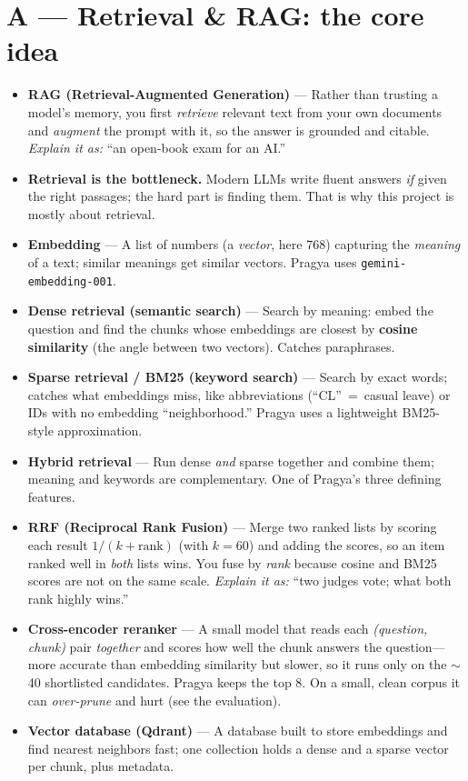 \documentclass[11pt,a4paper,oneside]{report}
\newcommand{\code}[1]{\texttt{#1}}
\begin{document}
\section{A --- Retrieval \& RAG: the core idea}
\begin{itemize}
  \item \textbf{RAG (Retrieval-Augmented Generation)} --- Rather than trusting a model's memory, you
  first \emph{retrieve} relevant text from your own documents and \emph{augment} the prompt with it, so
  the answer is grounded and citable. \emph{Explain it as:} ``an open-book exam for an AI.''
  \item \textbf{Retrieval is the bottleneck.} Modern LLMs write fluent answers \emph{if} given the right
  passages; the hard part is finding them. That is why this project is mostly about retrieval.
  \item \textbf{Embedding} --- A list of numbers (a \emph{vector}, here 768) capturing the \emph{meaning}
  of a text; similar meanings get similar vectors. Pragya uses \code{gemini-embedding-001}.
  \item \textbf{Dense retrieval (semantic search)} --- Search by meaning: embed the question and find the
  chunks whose embeddings are closest by \textbf{cosine similarity} (the angle between two vectors).
  Catches paraphrases.
  \item \textbf{Sparse retrieval / BM25 (keyword search)} --- Search by exact words; catches what
  embeddings miss, like abbreviations (``CL''~=~casual leave) or IDs with no embedding ``neighborhood.''
  Pragya uses a lightweight BM25-style approximation.
  \item \textbf{Hybrid retrieval} --- Run dense \emph{and} sparse together and combine them; meaning and
  keywords are complementary. One of Pragya's three defining features.
  \item \textbf{RRF (Reciprocal Rank Fusion)} --- Merge two ranked lists by scoring each result
  $1/(k+\text{rank})$ (with $k{=}60$) and adding the scores, so an item ranked well in \emph{both} lists
  wins. You fuse by \emph{rank} because cosine and BM25 scores are not on the same scale. \emph{Explain
  it as:} ``two judges vote; what both rank highly wins.''
  \item \textbf{Cross-encoder reranker} --- A small model that reads each \emph{(question, chunk)} pair
  \emph{together} and scores how well the chunk answers the question---more accurate than embedding
  similarity but slower, so it runs only on the $\sim$40 shortlisted candidates. Pragya keeps the top 8.
  On a small, clean corpus it can \emph{over-prune} and hurt (see the evaluation).
  \item \textbf{Vector database (Qdrant)} --- A database built to store embeddings and find nearest
  neighbors fast; one collection holds a dense and a sparse vector per chunk, plus metadata.
\end{itemize}
\end{document}
